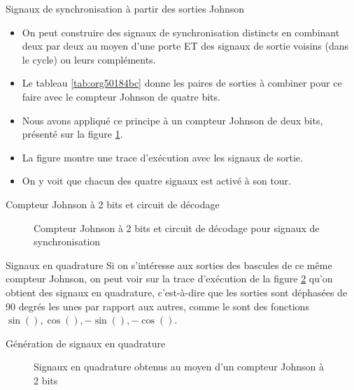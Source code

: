 \documentclass[presentation]{beamer}
\begin{document}
\begin{frame}[label={sec:org8af9808}]{Signaux de synchronisation à partir des sorties Johnson}
\begin{itemize}
\item On peut construire des signaux de synchronisation distincts en combinant deux par deux au moyen d'une porte ET des signaux de sortie voisins (dans le cycle) ou leurs compléments.

\item Le tableau \ref{tab:org50184bc} donne les paires de sorties à combiner pour ce faire avec le compteur Johnson de quatre bits.

\item Nous avons appliqué ce principe à un compteur Johnson de deux bits, présenté sur la figure \ref{fig:orga1606d5}.

\item La figure montre une trace d'exécution avec les signaux de sortie.

\item On y voit que chacun des quatre signaux est activé à son tour.
\end{itemize}
\end{frame}

\begin{frame}[label={sec:orgc2b5ecb}]{Compteur Johnson à 2 bits et circuit de décodage}
\begin{figure}[htbp]
\centering

\caption{\label{fig:orga1606d5}Compteur Johnson à 2 bits et circuit de décodage pour signaux de synchronisation}
\end{figure}
\end{frame}

\begin{frame}[label={sec:orgad0b489}]{Signaux en quadrature}
Si on s'intéresse aux sorties des bascules de ce même compteur
Johnson, on peut voir sur la trace d'exécution de la figure
\ref{fig:org620b63d} qu'on obtient des signaux en \alert{quadrature},
c'est-à-dire que les sorties sont déphasées de 90 degrés les unes par
rapport aux autres, comme le sont des fonctions \(\sin(), \cos(),
-\sin(), -\cos()\).
\end{frame}

\begin{frame}[label={sec:org9dff875}]{Génération de signaux en quadrature}
\begin{figure}[htbp]
\centering

\caption{\label{fig:org620b63d}Signaux en quadrature obtenus au moyen d'un compteur Johnson à 2 bits}
\end{figure} 
\end{frame}
\end{document}
